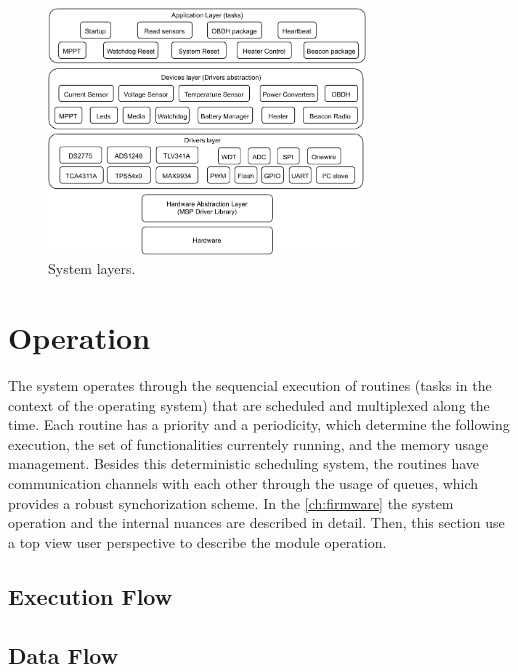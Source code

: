 \begin{figure}[!ht]
    \begin{center}
        \includegraphics[width=0.75\textwidth]{figures/eps-system-layers.pdf}
        \caption{System layers.}
        \label{fig:system-layers}
    \end{center}
\end{figure}

\section{Operation} \label{sec:operation}

The system operates through the sequencial execution of routines (tasks in the context of the operating system) that are scheduled and multiplexed along the time. Each routine has a priority and a periodicity, which determine the following execution, the set of functionalities currentely running, and the memory usage management. Besides this deterministic scheduling system, the routines have communication channels with each other through the usage of queues, which provides a robust synchorization scheme. In the \autoref{ch:firmware} the system operation and the internal nuances are described in detail. Then, this section use a top view user perspective to describe the module operation.

\subsection{Execution Flow}

\subsection{Data Flow}


